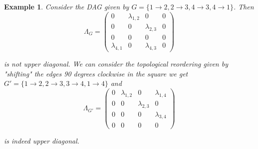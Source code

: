 \documentclass[10pt,a4paper]{article}
\newtheorem{example}{Example}
\begin{document}
\begin{example} Consider the DAG given by $G=\lbrace 1\rightarrow 2, 2\rightarrow 3, 4\rightarrow 3, 4 \rightarrow 1\rbrace$. Then
$$\Lambda_G=\left(\begin{array}{cccc}
0 & \lambda_{1,2} & 0 & 0\\
0 & 0 & \lambda_{2,3} & 0\\
0 & 0 & 0 & 0\\
\lambda_{4,1} & 0 & \lambda_{4,3} & 0
\end{array}\right)$$

\noindent
is not upper diagonal. We can consider the topological reordering given by "shifting" the edges 90 degrees clockwise in the square we get  $G'=\lbrace 1\rightarrow 2, 2\rightarrow 3, 3\rightarrow 4, 1 \rightarrow 4\rbrace$ and
$$\Lambda_{G'}=\left(\begin{array}{cccc}
0 & \lambda_{1,2} & 0 & \lambda_{1,4}\\
0 & 0 & \lambda_{2,3} & 0\\
0 & 0 & 0 & \lambda_{3,4}\\
0 & 0 & 0 & 0
\end{array}\right)$$

\noindent
is indeed upper diagonal.  
\end{example}
\end{document}
